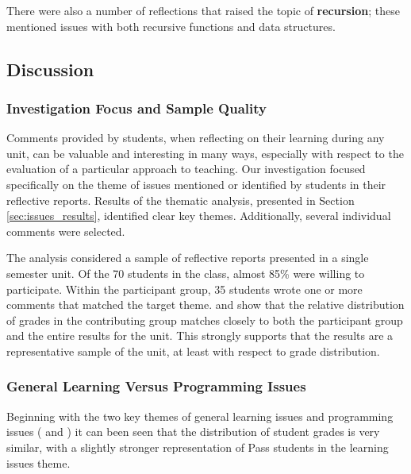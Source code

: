 There were also a number of reflections that raised the topic of \textbf{recursion}; these mentioned issues with both recursive functions and data structures. 


\subsection{Discussion} %
\label{sec:issues_discussion}

\subsubsection{Investigation Focus and Sample Quality}
Comments provided by students, when reflecting on their learning during any unit, can be valuable and interesting in many ways, especially with respect to the evaluation of a particular approach to teaching. Our investigation focused specifically on the theme of issues mentioned or identified by students in their reflective reports. Results of the thematic analysis, presented in Section \ref{sec:issues_results}, identified clear key themes. Additionally, several individual comments were selected.

The analysis considered a sample of reflective reports presented in a single semester unit. Of the 70 students in the class, almost 85\% were willing to participate. Within the participant group, 35 students wrote one or more comments that matched the target theme.  and  show that the relative distribution of grades in the contributing group matches closely to both the participant group and the entire results for the unit. This strongly supports that the results are a representative sample of the unit, at least with respect to grade distribution. 


\subsubsection{General Learning Versus Programming Issues} %
\label{sub:balance_of_learning_versus_programming_issues}

Beginning with the two key themes of general learning issues and programming issues ( and ) it can been seen that the distribution of student grades is very similar, with a slightly stronger representation of Pass students in the learning issues theme.

